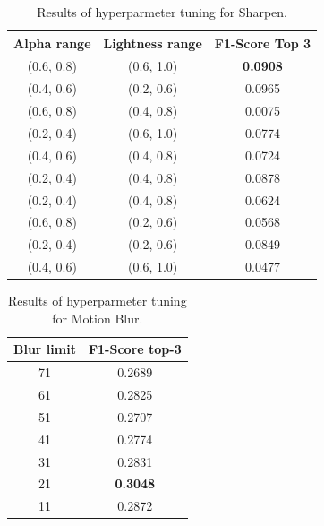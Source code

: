 
\begin{table}
\caption{Results of hyperparmeter tuning for Sharpen.}
    \label{tab:sharpen_hp}
    \centering
    \small
    \tabcolsep=0.11cm
    \begin{tabular}{|cc|c|}
    \hline
        Alpha range & Lightness range & F1-Score Top 3 \\ \hline
        (0.6, 0.8) & (0.6, 1.0) & \textbf{0.0908} \\ 
        (0.4, 0.6) & (0.2, 0.6) & 0.0965 \\ 
        (0.6, 0.8) & (0.4, 0.8) & 0.0075 \\ 
        (0.2, 0.4) & (0.6, 1.0)  & 0.0774 \\ 
        (0.4, 0.6) & (0.4, 0.8) & 0.0724 \\ 
        (0.2, 0.4) & (0.4, 0.8) & 0.0878 \\ 
        (0.2, 0.4) & (0.4, 0.8)  & 0.0624 \\ 
        (0.6, 0.8) & (0.2, 0.6)  & 0.0568 \\ 
        (0.2, 0.4) & (0.2, 0.6)  & 0.0849 \\ 
        (0.4, 0.6) & (0.6, 1.0)  & 0.0477 \\ \hline
    \end{tabular}
    
\end{table}

\begin{table}
\caption{Results of hyperparmeter tuning for Motion Blur.}
\label{tab:motion_blur_hp}
    \centering
    \small
    \tabcolsep=0.11cm
    \begin{tabular}{|c|c|}
    \hline
        Blur limit & F1-Score top-3 \\ \hline
        71 & 0.2689 \\ 
        61 & 0.2825 \\ 
        51 & 0.2707 \\ 
        41 & 0.2774 \\ 
        31 & 0.2831 \\ 
        21 & \textbf{0.3048} \\ 
        11 & 0.2872 \\ \hline
    \end{tabular}
    
\end{table}

